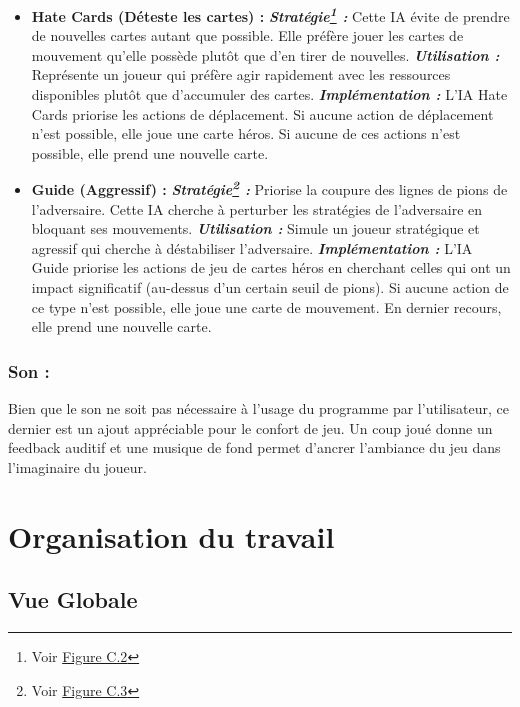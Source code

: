 \begin{itemize}
	\item \textbf{Hate Cards (Déteste les cartes) :}
        \subitem \textbf{\emph{Stratégie\footnote{Voir \hyperref[fig:hate1]{Figure C.2}} :}} Cette IA évite de prendre de nouvelles cartes autant que possible. Elle préfère jouer les cartes de mouvement qu'elle possède plutôt que d'en tirer de nouvelles.
		\subitem \textbf{\emph{Utilisation :}} Représente un joueur qui préfère agir rapidement avec les ressources disponibles plutôt que d'accumuler des cartes.
		\subitem \textbf{\emph{Implémentation :}} L'IA Hate Cards priorise les actions de déplacement. Si aucune action de déplacement n'est possible, elle joue une carte héros. Si aucune de ces actions n'est possible, elle prend une nouvelle carte.\\
	\item \textbf{Guide (Aggressif) :}
		\subitem \textbf{\emph{Stratégie\footnote{Voir \hyperref[fig:guide1]{Figure C.3}} :}} Priorise la coupure des lignes de pions de l'adversaire. Cette IA cherche à perturber les stratégies de l'adversaire en bloquant ses mouvements.
		\subitem \textbf{\emph{Utilisation :}} Simule un joueur stratégique et agressif qui cherche à déstabiliser l'adversaire.
		\subitem \textbf{\emph{Implémentation :}} L'IA Guide priorise les actions de jeu de cartes héros en cherchant celles qui ont un impact significatif (au-dessus d'un certain seuil de pions). Si aucune action de ce type n'est possible, elle joue une carte de mouvement. En dernier recours, elle prend une nouvelle carte.
\end{itemize}


\subsubsection*{Son :}
Bien que le son ne soit pas nécessaire à l’usage du programme par l’utilisateur, ce dernier est un ajout appréciable pour le confort de jeu. Un coup joué donne un feedback auditif et une musique de fond permet d’ancrer l’ambiance du jeu dans l’imaginaire du joueur.

\section{Organisation du travail}

\subsection{Vue Globale}

